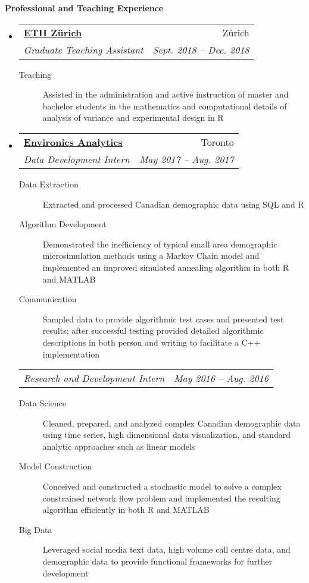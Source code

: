 \documentclass[letterpaper,11pt]{article}
\makeatletter
\newcommand{\resheading}[1]{\colorbox{resBlue}{\begin{minipage}{\textwidth}
			\textbf{#1}
\end{minipage}} \vspace{-14pt}}
\newcommand{\resitem}[4]{\begin{tabular*}{17.5cm}{l@{\extracolsep{\fill}}r} \textbf{#1} & #2 \\ \textit{#3} & \textit{#4} \\ \end{tabular*} \vspace{-6pt}}
\newcommand{\ressubitem}[2]{\begin{tabular*}{17.5cm}{l@{\extracolsep{\fill}}r} \textit{#1} & \textit{#2} \\ \end{tabular*} \vspace{-6pt}}
\makeatother
\begin{document}
\resheading{Professional and Teaching Experience}
\begin{itemize}
\item
	\resitem{\href{https://www.ethz.ch/en.html}{ETH Z\"urich}}{Z\"urich}{Graduate Teaching Assistant}{Sept. 2018 -- Dec. 2018}
		{\footnotesize \begin{description}
			\item[Teaching] Assisted in the administration and active instruction of master and bachelor students in the mathematics and computational details of analysis of variance and experimental design in R
		\end{description} \vspace{-4pt}}
\item 
	\resitem{\href{https://www.environicsanalytics.com/en-ca/about}{Environics Analytics}}{Toronto}{Data Development Intern}{May 2017 -- Aug. 2017}
		{\footnotesize \begin{description}
				\item[Data Extraction] Extracted and processed Canadian demographic data using SQL and R
				\item[Algorithm Development] Demonstrated the inefficiency of typical small area demographic microsimulation methods using a Markov Chain model and implemented an improved simulated annealing algorithm in both R and MATLAB
				\item[Communication] Sampled data to provide algorithmic test cases and presented test results; after successful testing provided detailed algorithmic descriptions in both person and writing to facilitate a C++ implementation
			\end{description} \vspace{-4pt}}
	\ressubitem{Research and Development Intern}{May 2016 -- Aug. 2016}
		{\footnotesize \begin{description}
				\item[Data Science] Cleaned, prepared, and analyzed complex Canadian demographic data using time series, high dimensional data visualization, and standard analytic approaches such as linear models
				\item[Model Construction] Conceived and constructed a stochastic model to solve a complex constrained network flow problem and implemented the resulting algorithm efficiently in both R and MATLAB
				\item[Big Data] Leveraged social media text data, high volume call centre data, and demographic data to provide functional frameworks for further development
			\end{description}}

\end{itemize}
\end{document}
